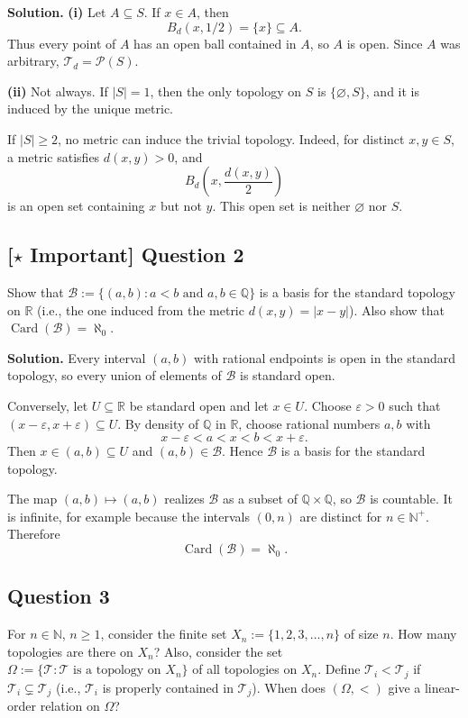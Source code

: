 \documentclass{article}
\newcommand{\R}{\mathbb{R}}
\newcommand{\Q}{\mathbb{Q}}
\newcommand{\N}{\mathbb{N}}
\newcommand{\important}{\texorpdfstring{\textbf{[\(\star\) Important]}}{[Important]}}
\newenvironment{solution}{\par\noindent\textbf{Solution.}\quad}{\par}
\begin{document}
\begin{solution}
\textbf{(i)} Let $A\subseteq S$. If $x\in A$, then
\[
  B_d(x,1/2)=\{x\}\subseteq A.
\]
Thus every point of $A$ has an open ball contained in $A$, so $A$ is open.
Since $A$ was arbitrary, $\mathcal T_d=\mathcal P(S)$.

\textbf{(ii)} Not always. If $|S|=1$, then the only topology on $S$ is
$\{\varnothing,S\}$, and it is induced by the unique metric.

If $|S|\ge2$, no metric can induce the trivial topology. Indeed, for
distinct $x,y\in S$, a metric satisfies $d(x,y)>0$, and
\[
  B_d\left(x,\frac{d(x,y)}2\right)
\]
is an open set containing $x$ but not $y$. This open set is neither
$\varnothing$ nor $S$.
\end{solution}

\subsection{\important{} Question 2}
Show that $\mathcal{B} := \{(a, b) : a < b \text{ and } a, b \in \Q\}$ is a basis for the standard topology on $\R$ (i.e., the one induced from the metric $d(x, y) = |x - y|$). Also show that $\operatorname{Card}(\mathcal{B}) = \aleph_0$.

\begin{solution}
Every interval $(a,b)$ with rational endpoints is open in the standard
topology, so every union of elements of $\mathcal B$ is standard open.

Conversely, let $U\subseteq\R$ be standard open and let $x\in U$. Choose
$\varepsilon>0$ such that $(x-\varepsilon,x+\varepsilon)\subseteq U$.
By density of $\Q$ in $\R$, choose rational numbers $a,b$ with
\[
  x-\varepsilon<a<x<b<x+\varepsilon.
\]
Then $x\in(a,b)\subseteq U$ and $(a,b)\in\mathcal B$. Hence
$\mathcal B$ is a basis for the standard topology.

The map $(a,b)\mapsto(a,b)$ realizes $\mathcal B$ as a subset of
$\Q\times\Q$, so $\mathcal B$ is countable. It is infinite, for example
because the intervals $(0,n)$ are distinct for $n\in\N^+$. Therefore
\[
  \operatorname{Card}(\mathcal B)=\aleph_0.
\]
\end{solution}

\subsection{Question 3}
For $n \in \N$, $n \ge 1$, consider the finite set $X_n := \{1, 2, 3, \dots, n\}$ of size $n$. How many topologies are there on $X_n$? Also, consider the set $\Omega := \{\mathcal{T} : \mathcal{T} \text{ is a topology on } X_n\}$ of all topologies on $X_n$. Define $\mathcal{T}_i < \mathcal{T}_j$ if $\mathcal{T}_i \subsetneq \mathcal{T}_j$ (i.e., $\mathcal{T}_i$ is properly contained in $\mathcal{T}_j$). When does $(\Omega, <)$ give a linear-order relation on $\Omega$?
\end{document}
